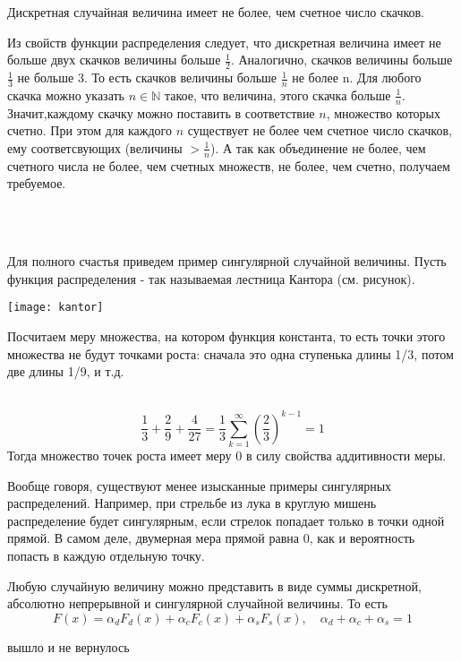 \documentclass[../TV&MS.tex]{subfiles}
\begin{document}
\begin{St}
	Дискретная случайная величина имеет не более, чем счетное число скачков.
\end{St}
\begin{Proof}
Из свойств функции распределения следует, что дискретная величина имеет не больше двух скачков величины больше $\frac12$. Аналогично, скачков величины больше $\frac13$ не больше 3. То есть скачков величины больше $\frac1n$ не более n. Для любого скачка можно указать $n \in \mathbb{N}$ такое, что величина, этого скачка больше 
$\frac1n$. Значит,каждому скачку можно поставить в соответствие $n$, множество которых счетно. При этом для каждого $n$ существует не более чем счетное число скачков, ему соответсвующих (величины $>\frac1n$). А так как объединение не более, чем счетного числа не более, чем счетных множеств, не более, чем счетно, получаем 
требуемое. 
\end{Proof}\\ \\
\begin{Ex}
Для полного счастья приведем пример сингулярной случайной величины. Пусть функция распределения - так называемая лестница Кантора (см. рисунок).
\parbox[b][3 cm][t]{20mm}{\texttt{[image: kantor]}}
\hfill
\parbox[b][3 cm][t]{100mm}{
	Посчитаем меру множества, на котором функция константа, то есть точки этого множества не будут точками роста: сначала это одна ступенька длины 1/3, потом две длины 1/9, и т.д.

}\\
	$$ \frac13 + \frac29 + \frac4{27} = \frac13 \sum\limits_{k=1}^\infty(\frac23)^{k-1} = 1$$
	Тогда множество точек роста имеет меру 0 в силу свойства аддитивности меры.
\end{Ex}

Вообще говоря, существуют менее изысканные примеры сингулярных распределений. Например, при стрельбе из лука в круглую мишень распределение будет сингулярным,
если стрелок попадает только в точки одной прямой. В самом деле, двумерная мера прямой равна 0, как и вероятность попасть в каждую отдельную точку. 

\begin{Th} [Лебега]
	Любую случайную величину можно представить в виде суммы дискретной, абсолютно непрерывной и сингулярной случайной величины. То есть 
	$$ F(x) = \alpha_dF_d(x) + \alpha_cF_c(x) + \alpha_sF_s(x), \quad \alpha_d + \alpha_c + \alpha_s = 1$$
\end{Th}
\begin{Proof}
вышло и не вернулось
\end{Proof}

\newpage
\end{document}
